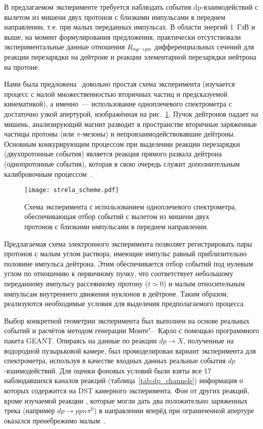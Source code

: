В предлагаемом эксперименте требуется наблюдать события dp-взаимодействий с
вылетом из мишени двух протонов с близкими импульсами в переднем направлении,
т.е. при малых переданных импульсах. В области энергий 1~ГэВ и выше, на момент
формулирования предложения, практически отсутствовали экспериментальные данные
отношения $R_{np \rightarrow pn}$ дифференциальных сечений для реакции перезарядки на дейтроне
и реакции элементарной перезарядки нейтрона на протоне.

Нами была предложена~\cite{bush00_mucha,glagolev00_mucha} довольно простая схема
эксперимента (изучается процесс с малой множественностью вторичных частиц и
предсказуемой кинематикой), а именно~--- использование одноплечевого
спектрометра с достаточно узкой апертурой, изображённая на
рис.~\ref{fig:strela_scheme}. Пучок дейтронов падает на мишень, анализирующий
магнит разводит в пространстве вторичные заряженные частицы протоны (или
$\pi$-мезоны) и непровзаимодействовавшие дейтроны. Основным конкурирующим
процессом при выделении реакции перезарядки (двухпротонные события) является
реакция прямого развала дейтрона (однопротонные события), которая в свою очередь
служит дополнительным калибровочным процессом~\cite{are_mucha04}.

\begin{figure}[h]
  \centering
  \texttt{[image: strela\_scheme.pdf]}
  \caption{Схема эксперимента с использованием одноплечевого спектрометра,
    обеспечивающая отбор событий с вылетом из мишени двух протонов с близкими
    импульсами в переднем направлении.}
  \label{fig:strela_scheme}
\end{figure}

Предлагаемая \! схема электронного эксперимента позволяет регистрировать пары
протонов с малым углом раствора, имеющие импульс равный приблизительно половине
импульса дейтрона. Этим обеспечивается отбор событий под нулевым углом по
отношению к первичному пучку, что соответствует небольшому переданному импульсу
рассеянному протону ($t \simeq 0$) и малым относительным импульсам внутреннего
движения нуклонов в дейтроне. Таким образом, реализуются необходимые условия для
выделения предполагаемого процесса.

Выбор конкретной геометрии эксперимента был выполнен на основе реальных событий
и расчётов методом генерации Монте"--~Карло с помощью программного пакета GEANT.
Опираясь на данные по реакции $dp \rightarrow X$, полученные на водородной
пузырьковой камере, был промоделирован вариант эксперимента для спектрометра,
используя в качестве входных данных реальные события $dp$-взаимодействий. Для
оценки фоновых условий были взяты все 17 наблюдавшихся каналов реакций
(таблица~\ref{tab:dp_channels}) информация о которых содержится на DST камерного
эксперимента. Фон от других реакций, кроме изучаемой реакции \dpfrag, которые
могли дать два положительно заряженных трека (например
$dp \rightarrow ppn\pi^{0}$) в направлении вперёд при ограниченной апертуре
оказался пренебрежимо малым~\cite{baz99}.

